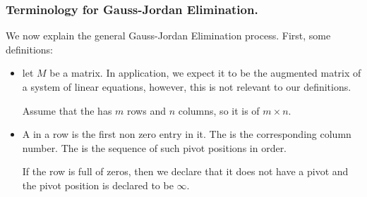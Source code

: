 \begin{frame} %

  \frametitle{Terminology for  Gauss-Jordan Elimination.}
  We now explain the general Gauss-Jordan Elimination process.
  First, some definitions:
  
  \begin{itemize}%

    \item let $M$ be a matrix. In application, we expect it to be the augmented matrix of
    a system of linear equations, however, this is not relevant to our
    definitions.

    Assume that the  has $m$ rows and $n$ columns, so it is of
     $m\times n$.
    
 \item A  in a row is the first non zero entry in it. The  is the corresponding column number. The  is the sequence of such pivot positions in
 order.

 If the row is full of zeros, then we declare that it does not have a
 pivot and the pivot position is declared to be $\infty$.

 
 
  \end{itemize}
\end{frame}


